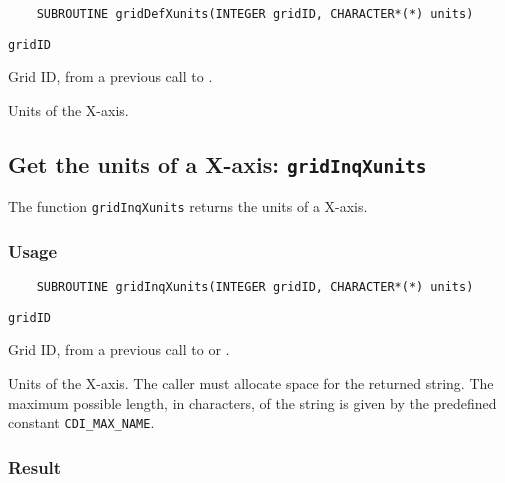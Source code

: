 \begin{verbatim}
    SUBROUTINE gridDefXunits(INTEGER gridID, CHARACTER*(*) units)
\end{verbatim}

\hspace*{4mm}\begin{minipage}[]{15cm}
\begin{deflist}{\tt gridID\ }
\item[{\tt gridID}]
Grid ID, from a previous call to {}.
\item[{\tt units}]
Units of the X-axis.

\end{deflist}
\end{minipage}


\subsection{Get the units of a X-axis: {\tt gridInqXunits}}
\label{gridInqXunits}

The function {\tt gridInqXunits} returns the units of a X-axis.

\subsubsection*{Usage}

\begin{verbatim}
    SUBROUTINE gridInqXunits(INTEGER gridID, CHARACTER*(*) units)
\end{verbatim}

\hspace*{4mm}\begin{minipage}[]{15cm}
\begin{deflist}{\tt gridID\ }
\item[{\tt gridID}]
Grid ID, from a previous call to {} or {}.
\item[{\tt units}]
Units of the X-axis. The caller must allocate space for the
                    returned string. The maximum possible length, in characters, of
                    the string is given by the predefined constant {\tt CDI\_MAX\_NAME}.

\end{deflist}
\end{minipage}

\subsubsection*{Result}

